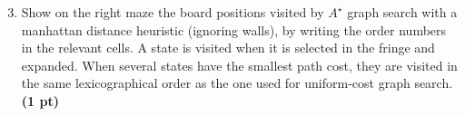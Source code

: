\documentclass[11pt,a4paper]{report}
\begin{document}
\begin{enumerate}
\setcounter{enumi}{2}
\item Show on the right maze the board positions visited by $A^{\star}$ graph search with a manhattan distance heuristic (ignoring walls), by writing the order numbers in the relevant cells. A state is visited when it is selected in the fringe and expanded. When several states have the smallest path cost, they are visited in the same lexicographical order as the one used for uniform-cost graph search. \textbf{(1 pt)}
\end{enumerate}

\begin{answers}[5.2cm]
\begin{center}
\end{center}
\end{answers}
\end{document}
